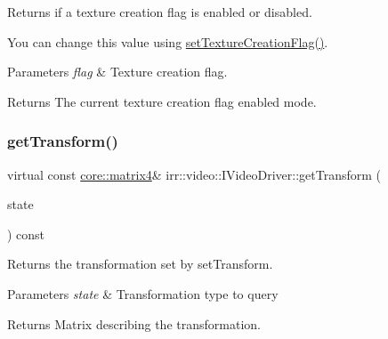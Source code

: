 Returns if a texture creation flag is enabled or disabled. 

You can change this value using \hyperlink{classirr_1_1video_1_1IVideoDriver_a868b58a6b86b9e4841ca3879ce246c4e}{set\+Texture\+Creation\+Flag()}. 
\begin{DoxyParams}{Parameters}
{\em flag} & Texture creation flag. \\
\hline
\end{DoxyParams}
\begin{DoxyReturn}{Returns}
The current texture creation flag enabled mode. 
\end{DoxyReturn}
\mbox{\label{classirr_1_1video_1_1IVideoDriver_a85c7d04aee02c2d5d8102279f9233101}} 
\subsubsection{\texorpdfstring{get\+Transform()}{getTransform()}\hspace{0.1cm}{\footnotesize\ttfamily [1/2]}}
{\footnotesize\ttfamily virtual const \hyperlink{namespaceirr_1_1core_a4c9d4e29899535971052810954a14431}{core\+::matrix4}\& irr\+::video\+::\+I\+Video\+Driver\+::get\+Transform (\begin{DoxyParamCaption}\item[{\hyperlink{namespaceirr_1_1video_a15b57657a320243be03ae6f66fcff43d}{E\+\_\+\+T\+R\+A\+N\+S\+F\+O\+R\+M\+A\+T\+I\+O\+N\+\_\+\+S\+T\+A\+TE}}]{state }\end{DoxyParamCaption}) const\hspace{0.3cm}{\ttfamily [pure virtual]}}



Returns the transformation set by set\+Transform. 


\begin{DoxyParams}{Parameters}
{\em state} & Transformation type to query \\
\hline
\end{DoxyParams}
\begin{DoxyReturn}{Returns}
Matrix describing the transformation. 
\end{DoxyReturn}
\mbox{\label{classirr_1_1video_1_1IVideoDriver_a85c7d04aee02c2d5d8102279f9233101}} 
